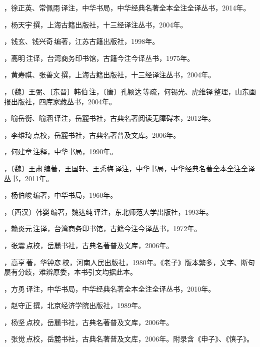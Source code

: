 ，徐正英、常佩雨\,译注，中华书局，中华经典名著全本全注全译丛书，2014年。

，杨天宇\,撰，上海古籍出版社，十三经译注丛书，2004年。

，钱玄、钱兴奇\,编著，江苏古籍出版社，1998年。

，高明\,注译，台湾商务印书馆，古籍今注今译丛书，1975年。

，黄寿祺、张善文\,撰，上海古籍出版社，十三经译注丛书，2004年。

，〔魏〕王弼、〔东晋〕韩伯\,注，〔唐〕孔颖达\,等疏，何锡光、虎维铎\,整理，山东画报出版社，四库家藏丛书，2004年。

，喻岳衡、喻涵\,译注，岳麓书社，古典名著阅读无障碍本，2012年。

，李维琦\,点校，岳麓书社，古典名著普及文库。2006年。

，何建章\,注释，中华书局，1990年。

，〔魏〕王肃\,编著，王国轩、王秀梅\,译注，中华书局，中华经典名著全本全注全译丛书，2011年。

，杨伯峻\,编著，中华书局，1960年。

，〔西汉〕韩婴\,编著，魏达纯\,译注，东北师范大学出版社，1993年。

，赖炎元\,注译，台湾商务印书馆，古籍今注今译丛书，1972年。

，张震\,点校，岳麓书社，古典名著普及文库，2006年。

，高亨\,著，华钟彦\,校，河南人民出版社，1980年。《老子》版本繁多，文字、断句屡有分歧，难辨原委，本书引文均据此本。

，方勇\,译注，中华书局，中华经典名著全本全注全译丛书，2010年。

，赵守正\,撰，北京经济学院出版社，1989年。

，杨坚\,点校，岳麓书社，古典名著普及文库，2006年。

，张觉\,点校，岳麓书社，古典名著普及文库，2006年。附录含《申子》、《慎子》。

